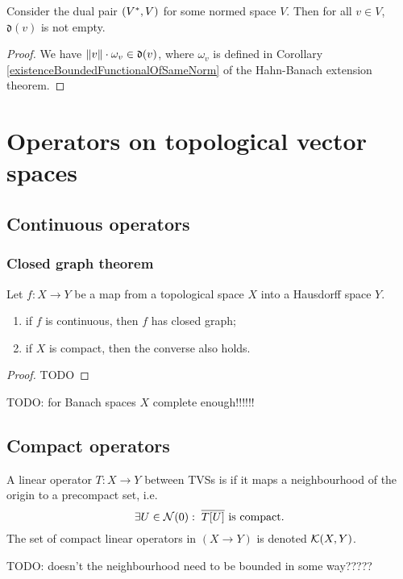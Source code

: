 \begin{proposition}
Consider the dual pair $\left( V^*, V \right)$ for some normed space $V$. Then for all $v\in V$, $\mathfrak{d}(v)$ is not empty.
\end{proposition}
\begin{proof}
We have $\lVert v\rVert\cdot \omega_v\in \mathfrak{d}(v)$, where $\omega_v$ is defined in Corollary \ref{existenceBoundedFunctionalOfSameNorm} of the Hahn-Banach extension theorem.
\end{proof}

\section{Operators on topological vector spaces}

\subsection{Continuous operators}
\subsubsection{Closed graph theorem}

\begin{theorem} \label{closedGraphTheorem}
Let $f:X\to Y$ be a map from a topological space $X$ into a Hausdorff space $Y$.
\begin{enumerate}
\item if $f$ is continuous, then $f$ has closed graph;
\item if $X$ is compact, then the converse also holds.
\end{enumerate}
\end{theorem}
\begin{proof}
TODO
\end{proof}
TODO: for Banach spaces $X$ complete enough!!!!!!


\subsection{Compact operators}
\begin{definition}
A linear operator $T:X\to Y$ between TVSs is  if it maps a neighbourhood of the origin to a precompact set, i.e.\ 
\[ \exists U \in \operatorname{\mathcal{N}}(0): \;  \text{$\overline{T[U]}$ is compact.} \]
The set of compact linear operators in $(X\to Y)$ is denoted $\operatorname{\mathcal{K}}(X,Y)$.
\end{definition}
TODO: doesn't the neighbourhood need to be bounded in some way?????


